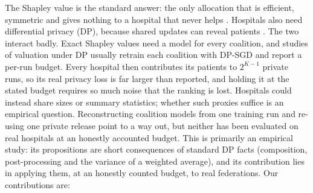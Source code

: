 \documentclass[journal]{IEEEtran}
\begin{document}
The Shapley value is the standard answer: the only allocation that is efficient, symmetric and gives nothing to a hospital that never helps \cite{Shapley1953, Ghorbani2019DataShapley}. Hospitals also need differential privacy (DP), because shared updates can reveal patients \cite{Shokri2017MIA, Abadi2016DPSGD}. The two interact badly. Exact Shapley values need a model for every coalition, and studies of valuation under DP usually retrain each coalition with DP-SGD and report a per-run budget. Every hospital then contributes its patients to $2^{K-1}$ private runs, so its real privacy loss is far larger than reported, and holding it at the stated budget requires so much noise that the ranking is lost. Hospitals could instead share sizes or summary statistics; whether such proxies suffice is an empirical question. Reconstructing coalition models from one training run \cite{Song2019BlockchainFL, Liu2022GTG} and re-using one private release \cite{Zhou2025Data} point to a way out, but neither has been evaluated on real hospitals at an honestly accounted budget. This is primarily an empirical study: its propositions are short consequences of standard DP facts (composition, post-processing and the variance of a weighted average), and its contribution lies in applying them, at an honestly counted budget, to real federations. Our contributions are:
\end{document}
